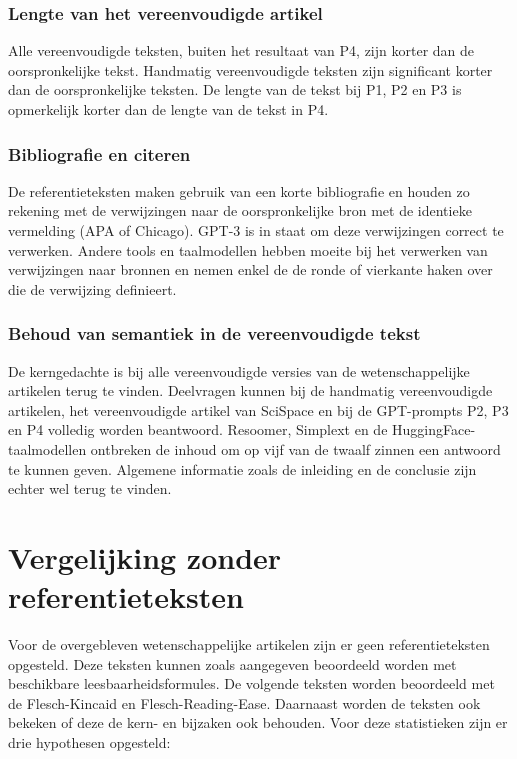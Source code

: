 \subsubsection{Lengte van het vereenvoudigde artikel}
Alle vereenvoudigde teksten, buiten het resultaat van P4, zijn korter dan de oorspronkelijke tekst. Handmatig vereenvoudigde teksten zijn significant korter dan de oorspronkelijke teksten. De lengte van de tekst bij P1, P2 en P3 is opmerkelijk korter dan de lengte van de tekst in P4.

\subsubsection{Bibliografie en citeren}
De referentieteksten maken gebruik van een korte bibliografie en houden zo rekening met de verwijzingen naar de oorspronkelijke bron met de identieke vermelding (APA of Chicago). GPT-3 is in staat om deze verwijzingen correct te verwerken. Andere tools en taalmodellen hebben moeite bij het verwerken van verwijzingen naar bronnen en nemen enkel de de ronde of vierkante haken over die de verwijzing definieert.

\subsubsection{Behoud van semantiek in de vereenvoudigde tekst}
De kerngedachte is bij alle vereenvoudigde versies van de wetenschappelijke artikelen terug te vinden. Deelvragen kunnen bij de handmatig vereenvoudigde artikelen, het vereenvoudigde artikel van SciSpace en bij de GPT-prompts P2, P3 en P4 volledig worden beantwoord. Resoomer, Simplext en de HuggingFace-taalmodellen ontbreken de inhoud om op vijf van de twaalf zinnen een antwoord te kunnen geven. Algemene informatie zoals de inleiding en de conclusie zijn echter wel terug te vinden.

\section{Vergelijking zonder referentieteksten}
Voor de overgebleven wetenschappelijke artikelen zijn er geen referentieteksten opgesteld. Deze teksten kunnen zoals aangegeven beoordeeld worden met beschikbare leesbaarheidsformules. De volgende teksten worden beoordeeld met de Flesch-Kincaid en Flesch-Reading-Ease. Daarnaast worden de teksten ook bekeken of deze de kern- en bijzaken ook behouden. Voor deze statistieken zijn er drie hypothesen opgesteld:

